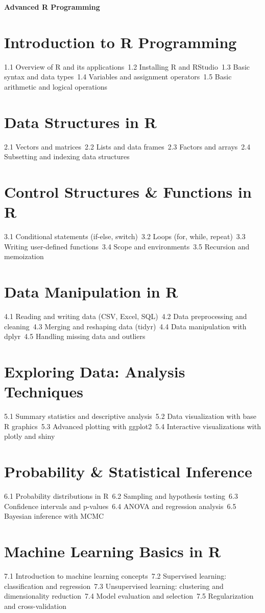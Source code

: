 {\LARGE \bf{Advanced R Programming}}
\section{Introduction to R Programming}
1.1 Overview of R and its applications\
1.2 Installing R and RStudio\
1.3 Basic syntax and data types\
1.4 Variables and assignment operators\
1.5 Basic arithmetic and logical operations\
\section{Data Structures in R}
2.1 Vectors and matrices\
2.2 Lists and data frames\
2.3 Factors and arrays\
2.4 Subsetting and indexing data structures\
\section{Control Structures \& Functions in R}
3.1 Conditional statements (if-else, switch)\
3.2 Loops (for, while, repeat)\
3.3 Writing user-defined functions\
3.4 Scope and environments\
3.5 Recursion and memoization\
\section{Data Manipulation in R}
4.1 Reading and writing data (CSV, Excel, SQL)\
4.2 Data preprocessing and cleaning\
4.3 Merging and reshaping data (tidyr)\
4.4 Data manipulation with dplyr\
4.5 Handling missing data and outliers\
\section{Exploring Data: Analysis Techniques}
5.1 Summary statistics and descriptive analysis\
5.2 Data visualization with base R graphics\
5.3 Advanced plotting with ggplot2\
5.4 Interactive visualizations with plotly and shiny\
\section{Probability \& Statistical Inference}
6.1 Probability distributions in R\
6.2 Sampling and hypothesis testing\
6.3 Confidence intervals and p-values\
6.4 ANOVA and regression analysis\
6.5 Bayesian inference with MCMC\
\section{Machine Learning Basics in R}
7.1 Introduction to machine learning concepts\
7.2 Supervised learning: classification and regression\
7.3 Unsupervised learning: clustering and dimensionality reduction\
7.4 Model evaluation and selection\
7.5 Regularization and cross-validation\
